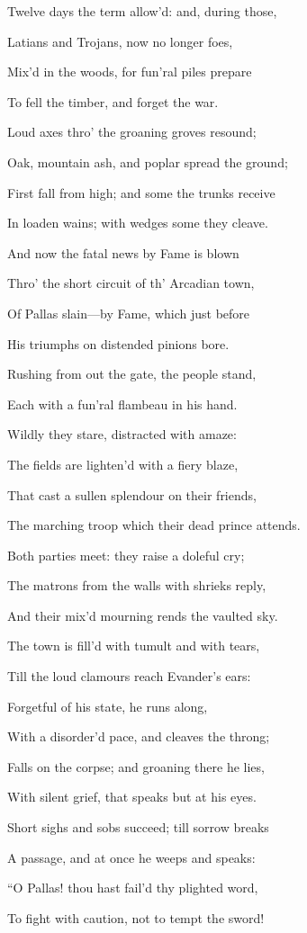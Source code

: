 Twelve days the term allow’d: and, during those,

Latians and Trojans, now no longer foes,

Mix’d in the woods, for fun’ral piles prepare

To fell the timber, and forget the war.

Loud axes thro’ the groaning groves resound;

Oak, mountain ash, and poplar spread the ground;

First fall from high; and some the trunks receive

In loaden wains; with wedges some they cleave.

And now the fatal news by Fame is blown

Thro’ the short circuit of th’ Arcadian town,

Of Pallas slain—by Fame, which just before

His triumphs on distended pinions bore.

Rushing from out the gate, the people stand,

Each with a fun’ral flambeau in his hand.

Wildly they stare, distracted with amaze:

The fields are lighten’d with a fiery blaze,

That cast a sullen splendour on their friends,

The marching troop which their dead prince attends.

Both parties meet: they raise a doleful cry;

The matrons from the walls with shrieks reply,

And their mix’d mourning rends the vaulted sky.

The town is fill’d with tumult and with tears,

Till the loud clamours reach Evander’s ears:

Forgetful of his state, he runs along,

With a disorder’d pace, and cleaves the throng;

Falls on the corpse; and groaning there he lies,

With silent grief, that speaks but at his eyes.

Short sighs and sobs succeed; till sorrow breaks

A passage, and at once he weeps and speaks:

“O Pallas! thou hast fail’d thy plighted word,

To fight with caution, not to tempt the sword!

